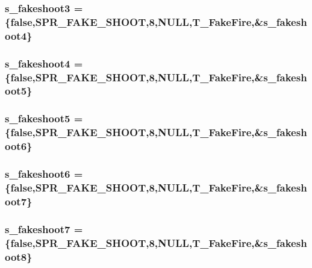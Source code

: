 \label{WL__ACT2_8C_ae09d40e3d3f28f4c95b02e8705cc48d8}
\hypertarget{WL__ACT2_8C_a29da19b83e69f1d3a51f8639f6358f0f}{
\subsubsection[{s\_\-fakeshoot3}]{ {\bf s\_\-fakeshoot3} = \{false,SPR\_\-FAKE\_\-SHOOT,8,NULL,T\_\-FakeFire,\&{\bf s\_\-fakeshoot4}\}}}
\label{WL__ACT2_8C_a29da19b83e69f1d3a51f8639f6358f0f}
\hypertarget{WL__ACT2_8C_a09c226f20369d67aebdcd7c41579a034}{
\subsubsection[{s\_\-fakeshoot4}]{ {\bf s\_\-fakeshoot4} = \{false,SPR\_\-FAKE\_\-SHOOT,8,NULL,T\_\-FakeFire,\&{\bf s\_\-fakeshoot5}\}}}
\label{WL__ACT2_8C_a09c226f20369d67aebdcd7c41579a034}
\hypertarget{WL__ACT2_8C_a3de1e1749978980bb4847b7fb2cba735}{
\subsubsection[{s\_\-fakeshoot5}]{ {\bf s\_\-fakeshoot5} = \{false,SPR\_\-FAKE\_\-SHOOT,8,NULL,T\_\-FakeFire,\&{\bf s\_\-fakeshoot6}\}}}
\label{WL__ACT2_8C_a3de1e1749978980bb4847b7fb2cba735}
\hypertarget{WL__ACT2_8C_aa5e6e46c4cc5c70646530b05d8d8f0f9}{
\subsubsection[{s\_\-fakeshoot6}]{ {\bf s\_\-fakeshoot6} = \{false,SPR\_\-FAKE\_\-SHOOT,8,NULL,T\_\-FakeFire,\&{\bf s\_\-fakeshoot7}\}}}
\label{WL__ACT2_8C_aa5e6e46c4cc5c70646530b05d8d8f0f9}
\hypertarget{WL__ACT2_8C_a7a10174c868f49b0c325e88f823b82e7}{
\subsubsection[{s\_\-fakeshoot7}]{ {\bf s\_\-fakeshoot7} = \{false,SPR\_\-FAKE\_\-SHOOT,8,NULL,T\_\-FakeFire,\&{\bf s\_\-fakeshoot8}\}}}
